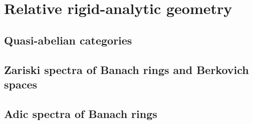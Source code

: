 \section{Relative rigid-analytic geometry}
    \subsection{Quasi-abelian categories}
    
    \subsection{Zariski spectra of Banach rings and Berkovich spaces}
    
    \subsection{Adic spectra of Banach rings}